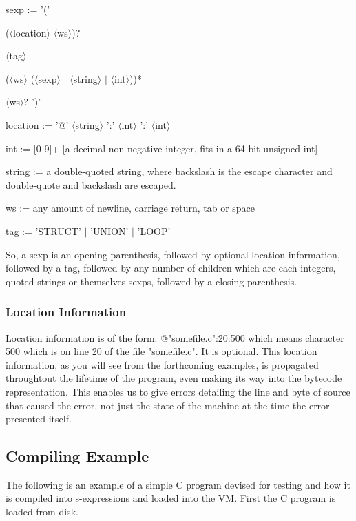 \documentclass[10pt,a4paper]{report}
\begin{document}
\begin{list}{}{}
\item sexp := '(' 
\item ($\langle$location$\rangle$ $\langle$ws$\rangle$)?
\item $\langle$tag$\rangle$
\item ($\langle$ws$\rangle$ ($\langle$sexp$\rangle$ $\vert$ $\langle$string$\rangle$ $\vert$ $\langle$int$\rangle$))*
\item $\langle$ws$\rangle$? ')'
\item
\item location := '@' $\langle$string$\rangle$ ':' $\langle$int$\rangle$ ':' $\langle$int$\rangle$
\item
\item int := [0-9]+ [a decimal non-negative integer, fits in a 64-bit unsigned int]
\item
\item string := a double-quoted string, where backslash is the escape character and double-quote and backslash are escaped.
\item
\item ws := any amount of newline, carriage return, tab or space
\item
\item tag := 'STRUCT' $\vert$ 'UNION' $\vert$ 'LOOP'
\end{list}

So, a sexp is an opening parenthesis, followed by optional location
information, followed by a tag, followed by any number of children
which are each integers, quoted strings or themselves sexps,
followed by a closing parenthesis.

\subsubsection{Location Information}
Location information is of the form: @"somefile.c":20:500 which means character 500 which is on line 20 of the file
"somefile.c". It is optional. This location information, as you will see from the forthcoming examples, is propagated throughtout the lifetime of the program, even making its way into the bytecode representation. This enables us to give errors detailing the line and byte of source that caused the error, not just the state of the machine at the time the error presented itself.

\subsection{Compiling Example}
The following is an example of a simple C program devised for testing and how it is compiled into s-expressions and loaded into the VM. First the C program is loaded from disk.
\end{document}

